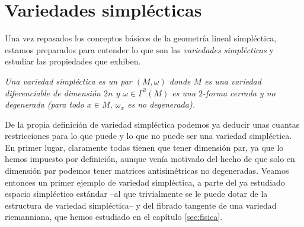 \section{Variedades simplécticas}\label{sec:variedades}
Una vez repasados los conceptos básicos de la geometría lineal simpléctica, estamos preparados para entender lo que son las \emph{variedades simplécticas} y estudiar las propiedades que exhiben.
\begin{defn}
  \em
  Una \emph{variedad simpléctica} es un par $(M,\omega)$ donde $M$ es una variedad diferenciable de dimensión $2n$ y $\omega \in \Gamma^2(M)$ es una $2$-forma cerrada y no degenerada (para todo $x \in M$, $\omega_x$ es no degenerada). 
\end{defn}

De la propia definición de variedad simpléctica podemos ya deducir unas cuantas restricciones para lo que puede y lo que no puede ser una variedad simpléctica. En primer lugar, claramente todas tienen que tener dimensión par, ya que lo hemos impuesto por definición, aunque venía motivado del hecho de que solo en dimensión par podemos tener matrices antisimétricas no degeneradas. Veamos entonces un primer ejemplo de variedad simpléctica, a parte del ya estudiado espacio simpléctico estándar --al que trivialmente se le puede dotar de la estructura de variedad simpléctica-- y del fibrado tangente de una variedad riemanniana, que hemos estudiado en el capítulo \ref{sec:fisica}.

